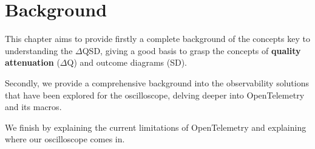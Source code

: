 \chapter{Background}
    This chapter aims to provide firstly a complete background of the concepts key to understanding the $\Delta$QSD, giving a good basis to grasp the concepts of \textbf{quality attenuation} ($\Delta$Q) and outcome diagrams (SD). 
    
    Secondly, we provide a comprehensive background into the observability solutions that have been explored for the oscilloscope, delving deeper into OpenTelemetry and its macros.
    
    We finish by explaining the current limitations of OpenTelemetry and explaining where our oscilloscope comes in.
    
    
    
    

